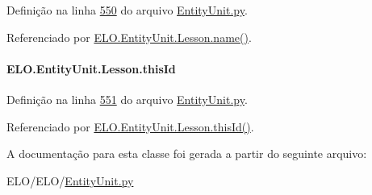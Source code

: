 Definição na linha \hyperlink{EntityUnit_8py_source_l00550}{550} do arquivo \hyperlink{EntityUnit_8py_source}{Entity\-Unit.\-py}.



Referenciado por \hyperlink{classELO_1_1EntityUnit_1_1Lesson_a5af62a54f008a391543fd8fabf30edcf}{E\-L\-O.\-Entity\-Unit.\-Lesson.\-name()}.

\hypertarget{classELO_1_1EntityUnit_1_1Lesson_a2ec9bd43b6b7ac7c7d00469c9f586271}{
\paragraph[{this\-Id}]{\setlength{\rightskip}{0pt plus 5cm}E\-L\-O.\-Entity\-Unit.\-Lesson.\-this\-Id}}\label{classELO_1_1EntityUnit_1_1Lesson_a2ec9bd43b6b7ac7c7d00469c9f586271}


Definição na linha \hyperlink{EntityUnit_8py_source_l00551}{551} do arquivo \hyperlink{EntityUnit_8py_source}{Entity\-Unit.\-py}.



Referenciado por \hyperlink{classELO_1_1EntityUnit_1_1Lesson_a1947d2d6413e7e94c8c524efe271af12}{E\-L\-O.\-Entity\-Unit.\-Lesson.\-this\-Id()}.



A documentação para esta classe foi gerada a partir do seguinte arquivo\-:\begin{DoxyCompactItemize}
\item 
E\-L\-O/\-E\-L\-O/\hyperlink{EntityUnit_8py}{Entity\-Unit.\-py}\end{DoxyCompactItemize}
